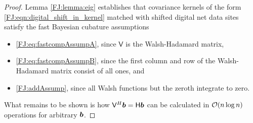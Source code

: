 \documentclass[graybox,footinfo]{svmult}
\begin{document}
\begin{proof}
Lemma \ref{FJ:lemma:eig} establishes that covariance kernels of the form \eqref{FJ:eqn:digital_shift_in_kernel} matched with shifted digital net data sites satisfy the fast Bayesian cubature assumptions
\begin{itemize}
    \item \eqref{FJ:eq:fastcompAssumpA}, since $\mathsf{V}$ is the Walsh-Hadamard matrix,
    
    \item  \eqref{FJ:eq:fastcompAssumpB}, since the first column and row of the  Walsh-Hadamard matrix consist of all ones, and
    
    \item \eqref{FJ:addAssump}, since all Walsh functions but the zeroth integrate to zero.
\end{itemize}
What remains to be shown is how $\mathsf{V}^H {\boldsymbol{b}} = \mathsf{H} {\boldsymbol{b}}$ can be calculated in ${\mathcal{O}}(n \log{n})$ operations for arbitrary ${\boldsymbol{b}}$.


\end{proof}
\end{document}

